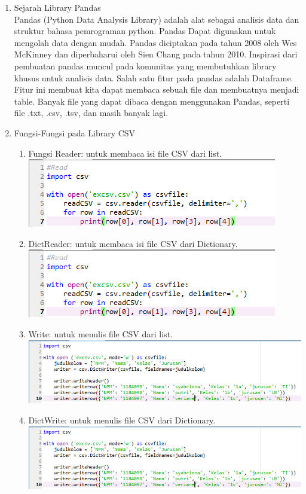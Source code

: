 \begin{enumerate}
\item Sejarah Library Pandas\\
Pandas (Python Data Analysis Library) adalah alat sebagai analisis data dan struktur bahasa pemrograman python. Pandas Dapat digunakan untuk mengolah data dengan mudah. Pandas diciptakan pada tahun 2008 oleh Wes McKinney dan diperbaharui oleh Sien Chang pada tahun 2010. Inspirasi dari pembuatan pandas muncul pada komunitas yang membutuhkan library khusus untuk analisis data. Salah satu fitur pada pandas adalah Dataframe. Fitur ini membuat kita dapat membaca sebuah file dan membuatnya menjadi table. Banyak file yang dapat dibaca dengan menggunakan Pandas, seperti file .txt, .csv, .tsv, dan masih banyak lagi.

\item Fungsi-Fungsi pada Library CSV\\
\begin{enumerate}
\item Fungsi Reader: untuk membaca isi file CSV dari list.\\
\includegraphics[scale = 0.7]{gambar/csv3.png}
\item DictReader: untuk membaca isi file  CSV dari Dictionary.\\
\includegraphics[scale = 0.7]{gambar/csv3.png}
\item Write: untuk menulis file  CSV dari list.\\
\includegraphics[scale = 0.5]{gambar/csv4.png}
\item DictWrite: untuk menulis file CSV dari Dictionary.\\
\includegraphics[scale = 0.5]{gambar/csv4.png}
\end{enumerate}


\end{enumerate}
